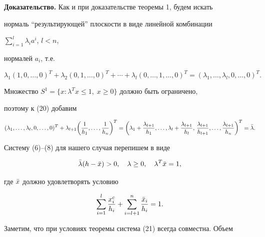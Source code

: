 {\bf Доказательство.} Как и при доказательстве теоремы 1, будем искать


нормаль ``результирующей'' плоскости в виде линейной комбинации


$\sum\limits^l_{i=1}\lambda_ia^i$, $l<n$,


нормалей $a_i$, т.е.


\begin{equation}


\lambda_1(1,0,\dotsc,0)^T+\lambda_2(0,1,\dotsc,0)^T+\dotsb


+\lambda_l(0,\dotsc,1,\dotsc,0)^T=(\lambda_1,\dotsc,\lambda_l,


0,\dotsc,0)^T.


\end{equation}


Множество $S^1=\{x:\lambda^Tx\le 1,\;x\ge 0\}$ должно быть ограничено,


поэтому к (20) добавим


$$


(\lambda_1,\dotsc,\lambda_l,0,\dotsc,0)^T+\lambda_{l+1}


\biggl(\frac{1}{h_1},\dotsc,\frac{1}{h_n}\biggr)^T=


\biggl(\lambda_1+\frac{\lambda_{l+1}}{h_1},\dotsc,\lambda_l+


\frac{\lambda_{l+1}}{h_l},\,\frac{\lambda_{l+1}}{h_{l+1}},\dotsc,


\frac{\lambda_{l+1}}{h_n}\biggr)^T=\Bar\lambda.


$$


Систему (6)--(8) для нашего случая перепишем в виде


\begin{equation}


\Bar\lambda(h-\Bar x)>0,\quad \lambda\ge 0,\quad


\lambda^T\Bar x=1,


\end{equation}


где $\Bar x$ должно удовлетворять условию


\begin{equation}


\sum^l_{i=1}\frac{x^c_i}{h_i}+\sum^n_{i=l+1}


\frac{\Bar x_i}{h_i}=1.


\end{equation}





Заметим, что при условиях теоремы система (21) всегда совместна. Объем


